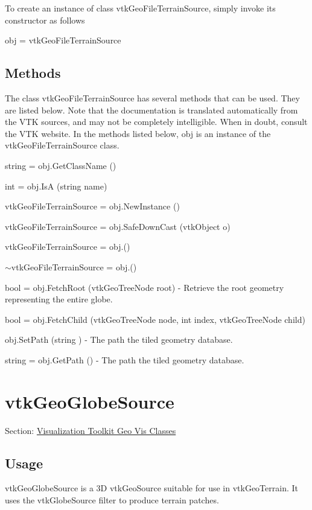 To create an instance of class vtk\-Geo\-File\-Terrain\-Source, simply invoke its constructor as follows \begin{DoxyVerb}  obj = vtkGeoFileTerrainSource
\end{DoxyVerb}
 \hypertarget{vtkwidgets_vtkxyplotwidget_Methods}{}\subsection{Methods}\label{vtkwidgets_vtkxyplotwidget_Methods}
The class vtk\-Geo\-File\-Terrain\-Source has several methods that can be used. They are listed below. Note that the documentation is translated automatically from the V\-T\-K sources, and may not be completely intelligible. When in doubt, consult the V\-T\-K website. In the methods listed below, {\ttfamily obj} is an instance of the vtk\-Geo\-File\-Terrain\-Source class. 
\begin{DoxyItemize}
\item {\ttfamily string = obj.\-Get\-Class\-Name ()}  
\item {\ttfamily int = obj.\-Is\-A (string name)}  
\item {\ttfamily vtk\-Geo\-File\-Terrain\-Source = obj.\-New\-Instance ()}  
\item {\ttfamily vtk\-Geo\-File\-Terrain\-Source = obj.\-Safe\-Down\-Cast (vtk\-Object o)}  
\item {\ttfamily vtk\-Geo\-File\-Terrain\-Source = obj.()}  
\item {\ttfamily $\sim$vtk\-Geo\-File\-Terrain\-Source = obj.()}  
\item {\ttfamily bool = obj.\-Fetch\-Root (vtk\-Geo\-Tree\-Node root)} -\/ Retrieve the root geometry representing the entire globe.  
\item {\ttfamily bool = obj.\-Fetch\-Child (vtk\-Geo\-Tree\-Node node, int index, vtk\-Geo\-Tree\-Node child)}  
\item {\ttfamily obj.\-Set\-Path (string )} -\/ The path the tiled geometry database.  
\item {\ttfamily string = obj.\-Get\-Path ()} -\/ The path the tiled geometry database.  
\end{DoxyItemize}\hypertarget{vtkgeovis_vtkgeoglobesource}{}\section{vtk\-Geo\-Globe\-Source}\label{vtkgeovis_vtkgeoglobesource}
Section\-: \hyperlink{sec_vtkgeovis}{Visualization Toolkit Geo Vis Classes} \hypertarget{vtkwidgets_vtkxyplotwidget_Usage}{}\subsection{Usage}\label{vtkwidgets_vtkxyplotwidget_Usage}
vtk\-Geo\-Globe\-Source is a 3\-D vtk\-Geo\-Source suitable for use in vtk\-Geo\-Terrain. It uses the vtk\-Globe\-Source filter to produce terrain patches.

